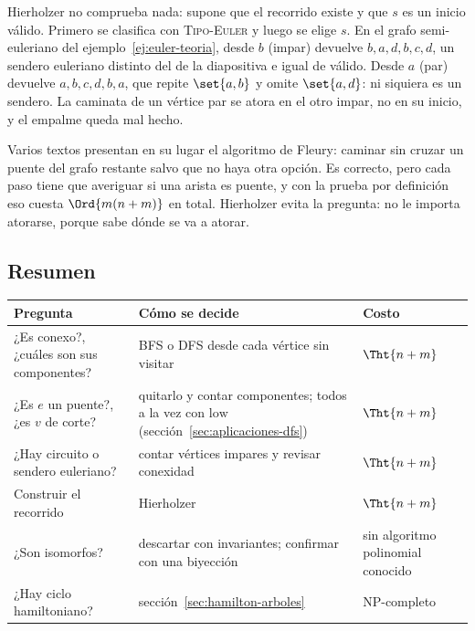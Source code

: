 \documentclass[11pt,letterpaper]{article}
\begin{document}
\begin{ojo}
  Hierholzer no comprueba nada: supone que el recorrido existe y que
  $s$ es un inicio válido. Primero se clasifica con
  \textsc{Tipo-Euler} y luego se elige $s$. En el grafo semi-euleriano
  del ejemplo~\ref{ej:euler-teoria}, desde $b$ (impar) devuelve
  $b, a, d, b, c, d$, un sendero euleriano distinto del de la
  diapositiva e igual de válido. Desde $a$ (par) devuelve
  $a, b, c, d, b, a$, que repite $\set{a, b}$ y omite $\set{a, d}$: ni
  siquiera es un sendero. La caminata de un vértice par se atora en el
  otro impar, no en su inicio, y el empalme queda mal hecho.
\end{ojo}

Varios textos presentan en su lugar el algoritmo de Fleury: caminar
sin cruzar un puente del grafo restante salvo que no haya otra opción.
Es correcto, pero cada paso tiene que averiguar si una arista es
puente, y con la prueba por definición eso cuesta $\Ord{m(n + m)}$ en
total. Hierholzer evita la pregunta: no le importa atorarse, porque
sabe dónde se va a atorar.


\subsection*{Resumen}

\begin{center}
\small
\begin{tabular}{>{\raggedright\arraybackslash}p{4.3cm}%
                >{\raggedright\arraybackslash}p{5.4cm}%
                >{\raggedright\arraybackslash}p{3.6cm}}
  \toprule
  \textbf{Pregunta} & \textbf{Cómo se decide} & \textbf{Costo} \\
  \midrule
  ¿Es conexo?, ¿cuáles son sus componentes? & BFS o DFS desde cada
    vértice sin visitar & $\Tht{n + m}$ \\
  \addlinespace
  ¿Es $e$ un puente?, ¿es $v$ de corte? & quitarlo y contar
    componentes; todos a la vez con $\text{low}$
    (sección~\ref{sec:aplicaciones-dfs}) & $\Tht{n + m}$ \\
  \addlinespace
  ¿Hay circuito o sendero euleriano? & contar vértices impares y
    revisar conexidad & $\Tht{n + m}$ \\
  \addlinespace
  Construir el recorrido & Hierholzer & $\Tht{n + m}$ \\
  \addlinespace
  ¿Son isomorfos? & descartar con invariantes; confirmar con una
    biyección & sin algoritmo polinomial conocido \\
  \addlinespace
  ¿Hay ciclo hamiltoniano? & sección~\ref{sec:hamilton-arboles}
    & NP-completo \\
  \bottomrule
\end{tabular}
\end{center}
\end{document}
